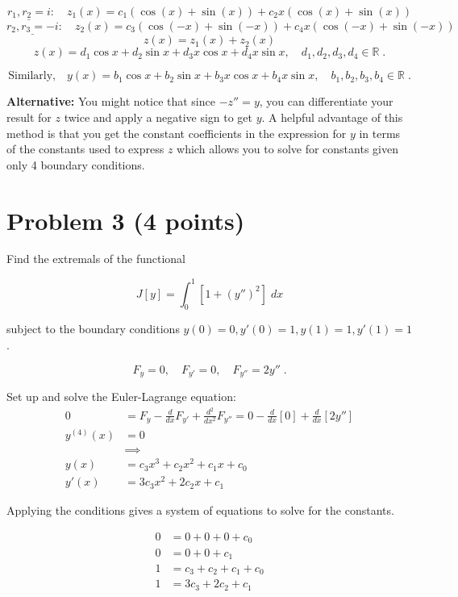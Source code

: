 \documentclass[a4paper]{article}
\begin{document}
$$\underline{r_1,r_2 = i}: \quad z_1(x) =  c_1(\cos (x) +  \sin (x)) + c_2 x (\cos (x) + \sin (x)) $$
$$\underline{r_2,r_3 = -i}: \quad z_2(x) = c_3( \cos(-x) +  \sin (-x)) + c_4 x (\cos (-x) +  \sin (-x) ) $$
$$ z(x) = z_1(x) + z_2(x)$$
$$z(x) = d_1\cos x + d_2 \sin x + d_3 x \cos x + d_4 x \sin x, \quad d_1, d_2, d_3, d_4 \in \mathbb{R}\;.$$

$$\text{Similarly,} \quad y(x) = b_1\cos x + b_2 \sin x + b_3 x \cos x + b_4 x \sin x, \quad b_1, b_2, b_3, b_4 \in \mathbb{R} \;.$$

{\bf Alternative:} You might notice that since $-z'' = y$, you can differentiate your result for $z$ twice and apply a negative sign to get $y$. A helpful advantage of this method is that you get the constant coefficients in the expression for $y$ in terms of the constants used to express $z$ which allows you to solve for constants given only 4 boundary conditions. 

\newpage

\section*{Problem 3 (4 points)}

Find the extremals of the functional

$$J[y] = \int_0^1 \left[ 1+ (y'')^2 \right] \; dx $$

subject to the boundary conditions $y(0) = 0, y'(0) = 1, y(1) = 1, y'(1) = 1$.

$$F_y = 0, \quad F_{y'} = 0, \quad F_{y''} = 2y'' \;. $$

Set up and solve the Euler-Lagrange equation:
\begin{align*}
0 &= F_y - \frac{d}{dx}F_{y'} + \frac{d^2}{dx^2} F_{y''} = 0 - \frac{d}{dx}[0] + \frac{d}{dx}[2y''] \\
y^{(4)}(x) &= 0 \\
&\implies \\
y(x) &= c_3x^3 + c_2x^2 + c_1x + c_0 \\
y'(x) &= 3c_3x^2 + 2c_2x + c_1
\end{align*}

Applying the conditions gives a system of equations to solve for the constants.

\begin{align*}
0 &= 0 + 0 + 0 + c_0 \\
0 &= 0 + 0 + c_1 \\
1 &= c_3 + c_2 + c_1 + c_0 \\
1 &= 3c_3 + 2c_2 + c_1
\end{align*}
\end{document}
